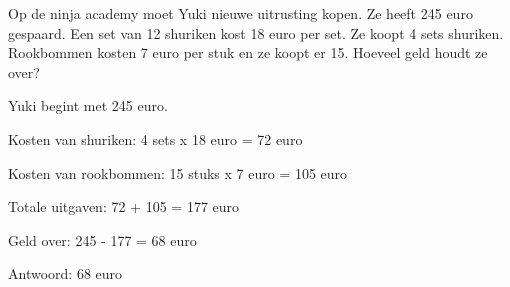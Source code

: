 \begin{opgave}
Op de ninja academy moet Yuki nieuwe uitrusting kopen. Ze heeft 245 euro 
gespaard. Een set van 12 shuriken kost 18 euro per set. Ze koopt 4 sets 
shuriken. Rookbommen kosten 7 euro per stuk en ze koopt er 15. Hoeveel geld 
houdt ze over?
\end{opgave}

\begin{oplossing}
Yuki begint met 245 euro.

Kosten van shuriken:
4 sets x 18 euro = 72 euro

Kosten van rookbommen:
15 stuks x 7 euro = 105 euro

Totale uitgaven:
72 + 105 = 177 euro

Geld over:
245 - 177 = 68 euro

Antwoord: 68 euro
\end{oplossing}